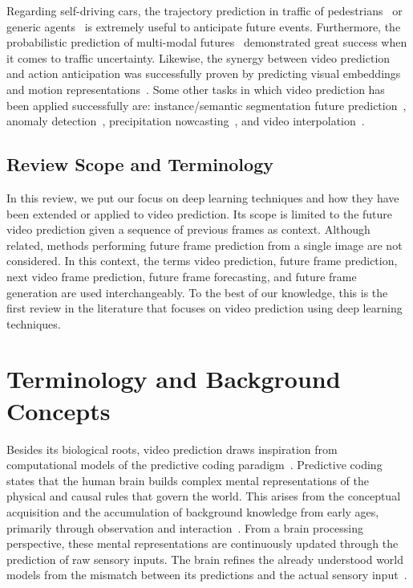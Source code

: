 Regarding self-driving cars, the trajectory prediction in traffic of pedestrians~\cite{Bhattacharyya2018} or generic agents~\cite{Choi2020} is extremely useful to anticipate future events. Furthermore, the probabilistic prediction of multi-modal futures~\cite{Hu2020} demonstrated great success when it comes to traffic uncertainty. Likewise, the synergy between video prediction and action anticipation was successfully proven by predicting visual embeddings~\cite{Gammulle2019} and motion representations~\cite{Opazo2018}. Some other tasks in which video prediction has been applied successfully are: instance/semantic segmentation future prediction~\cite{Luc2018,Bhattacharyya2019,Terwilliger2019}, anomaly detection~\cite{Liu2018a}, precipitation nowcasting~\cite{Shi2015,Shi2017}, and video interpolation~\cite{Liu2017}.

\subsection{Review Scope and Terminology}
In this review, we put our focus on deep learning techniques and how they have been extended or applied to video prediction. Its scope is limited to the future video prediction given a sequence of previous frames as context. Although related, methods performing future frame prediction from a single image are not considered. In this context, the terms
video prediction, future frame prediction, next video frame prediction, future frame forecasting, and future frame generation are used interchangeably. To the best of our knowledge, this is the first review in the literature that focuses on video prediction using deep learning techniques.


\section{Terminology and Background Concepts}
\label{sec:video_prediction}
Besides its biological roots, video prediction draws inspiration from computational models of the predictive coding paradigm~\cite{Softky1995,Rao1999,Deco2001,Hollingworth2004}. Predictive coding states that the human brain builds complex mental representations of the physical and causal rules that govern the world. This arises from the conceptual acquisition and the accumulation of background knowledge from early ages, primarily through observation and interaction~\cite{Cleeremans1991,Cleeremans1993,Baker2014}. From a brain processing perspective, these mental representations are continuously updated through the prediction of raw sensory inputs. The brain refines the already understood world models from the mismatch between its predictions and the actual sensory input~\cite{Ouden2012}.

